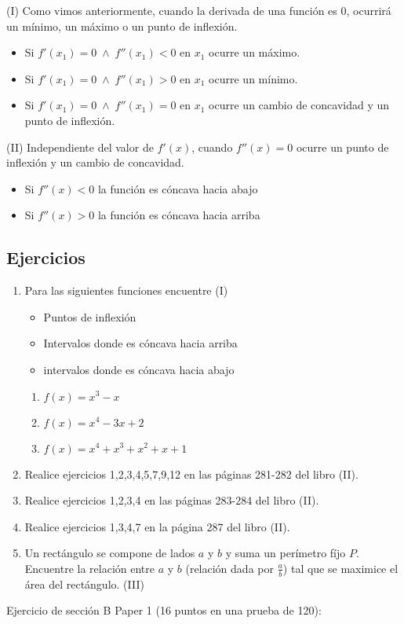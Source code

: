 \documentclass[spanish,12pt]{article}
\begin{document}
(I) Como vimos anteriormente, cuando la derivada de una función es 0, ocurrirá un mínimo, un máximo o un punto de inflexión. 

\begin{itemize}
    \item Si $f'(x_1)=0 \;\land\; f''(x_1)<0$ en $x_1$ ocurre un máximo. 
    \item Si $f'(x_1)=0 \;\land\; f''(x_1)>0$ en $x_1$ ocurre un mínimo. 
    \item Si $f'(x_1)=0 \;\land\; f''(x_1)=0$ en $x_1$ ocurre un cambio de concavidad y un punto de inflexión. 
\end{itemize}

(II) Independiente del valor de $f'(x)$, cuando $f''(x)=0$ ocurre un punto de inflexión y un cambio de concavidad.

\begin{itemize}
    \item Si $f''(x)<0$ la función es cóncava hacia abajo
    \item Si $f''(x)>0$ la función es cóncava hacia arriba
\end{itemize}
\newpage
\subsection{Ejercicios}
\begin{enumerate}[1)]
    \item  Para las siguientes funciones encuentre (I)
    \begin{itemize}
    \item Puntos de inflexión
    \item Intervalos donde es cóncava hacia arriba
    \item intervalos donde es cóncava hacia abajo
    \end{itemize}
    \begin{enumerate}
        \item $f(x)=x^3-x$
        \item $f(x)=x^4-3x+2$
        \item $f(x)=x^4+x^3+x^2+x+1$ 
    \end{enumerate}
    \item Realice ejercicios 1,2,3,4,5,7,9,12 en las páginas 281-282 del libro (II).
    \item Realice ejercicios 1,2,3,4 en las páginas 283-284 del libro (II).
    \item Realice ejercicios 1,3,4,7 en la página 287 del libro (II).
    \item Un rectángulo se compone de lados $a$ y $b$ y suma un perímetro fíjo $P$. Encuentre la relación entre $a$ y $b$ (relación dada por $\frac{a}{b}$) tal que se maximice el área del rectángulo.  (III)
\end{enumerate}
\newpage
Ejercicio de sección B Paper 1 (16 puntos en una prueba de 120):
\end{document}
